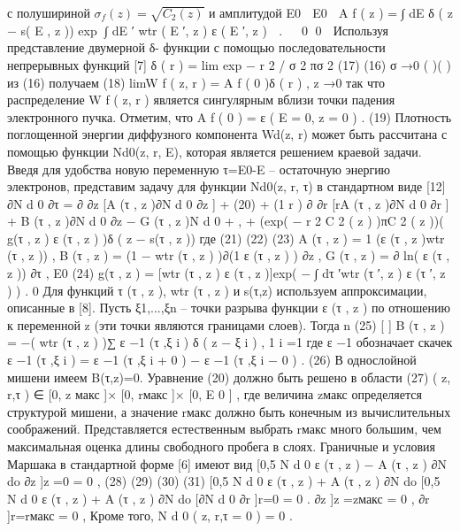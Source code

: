 с полушириной $\sigma_f(z)=\sqrt{C_2 (z)}$ и амплитудой
E0
 E0

A f ( z ) = ∫ dE δ ( z − s( E , z )) exp ∫ dE ′ wtr ( E ′, z ) ε ( E ′, z )  .


0
0

Используя представление двумерной δ- функции с помощью последовательности
непрерывных функций [7]
δ ( r ) = lim exp − r 2 / σ 2 πσ 2
(17)
(16)
σ →0
(
)( )
из (16) получаем
(18)
limW f ( z, r ) = A f ( 0 )δ ( r ) ,
z →0
так что распределение W f ( z, r ) является сингулярным вблизи точки падения
электронного пучка. Отметим, что
A f ( 0 ) = ε ( E = 0, z = 0 ) .
(19)
Плотность поглощенной энергии диффузного компонента Wd(z, r) может быть
рассчитана с помощью функции Nd0(z, r, E), которая является решением краевой задачи.
Введя для удобства новую переменную τ=E0-E – остаточную энергию электронов,
представим задачу для функции Nd0(z, r, τ) в стандартном виде [12]
∂N d 0 ∂τ = ∂ ∂z [A (τ , z )∂N d 0 ∂z ] +
(20)
+ (1 r ) ∂ ∂r [rA (τ , z )∂N d 0 ∂r ] + B (τ , z )∂N d 0 ∂z − G (τ , z )N d 0 + ,
+ (exp( − r 2 C 2 ( z ) )πC 2 ( z ))( g(τ , z ) ε (τ , z ) )δ ( z − s(τ , z ))
где
(21)
(22)
(23)
A (τ , z ) = 1 (ε (τ , z )wtr (τ , z )) ,
B (τ , z ) = (1 − wtr (τ , z ) )∂(1 ε (τ , z ) ) ∂z ,
G (τ , z ) = ∂ ln( ε (τ , z )) ∂τ ,
E0
(24)
g(τ , z ) = [wtr (τ , z ) ε (τ , z )]exp( − ∫ dτ ′wtr (τ ′, z ) ε (τ ′, z ) ) .
0
Для функций τ (τ , z ), wtr (τ , z ) и s(τ,z) используем аппроксимации, описанные в [8].
Пусть ξ1,...,ξn – точки разрыва функции ε (τ , z ) по отношению к переменной z (эти
точки являются границами слоев). Тогда
n
(25)
{ }
[
]
B (τ , z ) = −( wtr (τ , z ) )∑ ε −1 (τ ,ξ i ) δ ( z − ξ i ) ,
1
i =1
где ε −1 обозначает скачек
{
}
ε −1 (τ ,ξ i ) = ε −1 (τ ,ξ i + 0 ) − ε −1 (τ ,ξ i − 0 ) .
(26)
В однослойной мишени имеем B(τ,z)=0.
Уравнение (20) должно быть решено в области
(27)
( z, r,τ ) ∈ [0, z макс ]× [0, rмакс ]× [0, E 0 ] ,
где величина zмакс определяется структурой мишени, а значение rмакс должно быть
конечным из вычислительных соображений. Представляется естественным выбрать rмакс
много большим, чем максимальная оценка длины свободного пробега в слоях.
Граничные и условия Маршака в стандартной форме [6] имеют вид
[0,5 N d 0 ε (τ , z ) − A (τ , z ) ∂N do ∂z ]z =0 = 0 ,
(28)
(29)
(30)
(31)
[0,5 N d 0 ε (τ , z ) + A (τ , z ) ∂N do
[0,5 N d 0 ε (τ , z ) + A (τ , z ) ∂N do
[∂N d 0 ∂r ]r=0 = 0 .
∂z ]z =zмакс = 0 ,
∂r ]r=rмакс = 0 ,
Кроме того,
N d 0 ( z, r,τ = 0 ) = 0 .

